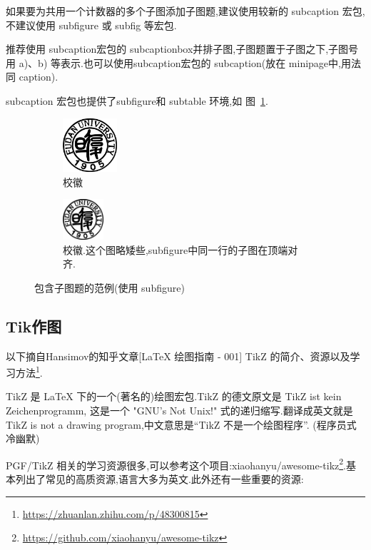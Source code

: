 \documentclass[a4paper,punct=banjiao,twoside]{ctexrep}
\theoremstyle{plain}
\theoremstyle{definition}
\theoremstyle{remark}
\begin{document}
如果要为共用一个计数器的多个子图添加子图题,建议使用较新的 subcaption 宏包,不建议使用 subfigure 或 subfig 等宏包.

推荐使用 subcaption宏包的 subcaptionbox并排子图,子图题置于子图之下,子图号用 a)、b) 等表示.也可以使用subcaption宏包的 subcaption(放在 minipage中,用法同 caption).

subcaption 宏包也提供了subfigure和 subtable 环境,如
图~\ref{fig:subfigure}.

\begin{figure}[!htp]
  \centering
  \begin{subfigure}{0.3\textwidth}
    \centering
    \includegraphics[height=2cm]{./figs/fudan-emblem.pdf}
    \caption{校徽}
  \end{subfigure}
  \hspace{1cm}
  \begin{subfigure}{0.4\textwidth}
    \centering
    \includegraphics[height=1.5cm]{./figs/fudan-emblem.pdf}
    \caption{校徽.这个图略矮些,subfigure中同一行的子图在顶端对齐.}
  \end{subfigure}
  \caption{包含子图题的范例(使用 subfigure)}
  \label{fig:subfigure}
\end{figure}

\subsection{Tik作图}
以下摘自Hansimov的知乎文章[LaTeX 绘图指南 - 001] TikZ 的简介、资源以及学习方法\footnote{\href{https://zhuanlan.zhihu.com/p/48300815}{https://zhuanlan.zhihu.com/p/48300815}}.

TikZ 是 LaTeX 下的一个(著名的)绘图宏包.TikZ 的德文原文是 TikZ ist kein Zeichenprogramm, 这是一个 "GNU's Not Unix!" 式的递归缩写.翻译成英文就是 TikZ is not a drawing program,中文意思是“TikZ 不是一个绘图程序”. (程序员式冷幽默)

PGF/TikZ 相关的学习资源很多,可以参考这个项目:xiaohanyu/awesome-tikz\footnote{\href{https://github.com/xiaohanyu/awesome-tikz}{https://github.com/xiaohanyu/awesome-tikz}}.基本列出了常见的高质资源,语言大多为英文.此外还有一些重要的资源:
\end{document}
